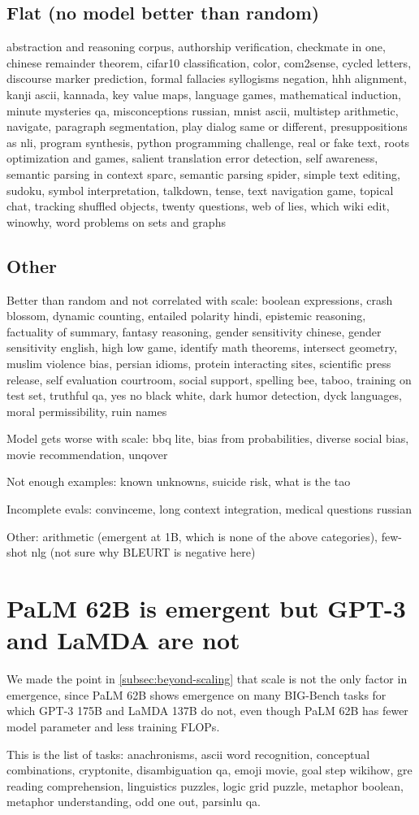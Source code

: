 \documentclass[10pt]{article} %
\begin{document}
\subsection{Flat (no model better than random)}\label{subsec:flat}
abstraction and reasoning corpus, authorship verification, checkmate in one, chinese remainder theorem, cifar10 classification, color, com2sense, cycled letters, discourse marker prediction, formal fallacies syllogisms negation, hhh alignment, kanji ascii, kannada, key value maps, language games, mathematical induction, minute mysteries qa, misconceptions russian, mnist ascii, multistep arithmetic, navigate, paragraph segmentation, play dialog same or different, presuppositions as nli, program synthesis, python programming challenge, real or fake text, roots optimization and games, salient translation error detection, self awareness, semantic parsing in context sparc, semantic parsing spider, simple text editing, sudoku, symbol interpretation, talkdown, tense, text navigation game, topical chat, tracking shuffled objects, twenty questions, web of lies, which wiki edit, winowhy, word problems on sets and graphs

\subsection{Other}
Better than random and not correlated with scale: boolean expressions, crash blossom, dynamic counting, entailed polarity hindi, epistemic reasoning, factuality of summary, fantasy reasoning, gender sensitivity chinese, gender sensitivity english, high low game, identify math theorems, intersect geometry, muslim violence bias, persian idioms, protein interacting sites, scientific press release, self evaluation courtroom, social support, spelling bee, taboo, training on test set, truthful qa, yes no black white, dark humor detection, dyck languages, moral permissibility, ruin names

Model gets worse with scale: bbq lite, bias from probabilities, diverse social bias, movie recommendation, unqover

Not enough examples: known unknowns, suicide risk, what is the tao

Incomplete evals: convinceme, long context integration, medical questions russian

Other: arithmetic (emergent at 1B, which is none of the above categories), few-shot nlg (not sure why BLEURT is negative here)

\section{PaLM 62B is emergent but GPT-3 and LaMDA are not}\label{sec:palm-62b-wins}
We made the point in \cref{subsec:beyond-scaling} that scale is not the only factor in emergence, since PaLM 62B shows emergence on many BIG-Bench tasks for which GPT-3 175B and LaMDA 137B do not, even though PaLM 62B has fewer model parameter and less training FLOPs.

This is the list of tasks: anachronisms, ascii word recognition, conceptual combinations, cryptonite, disambiguation qa, emoji movie, goal step wikihow, gre reading comprehension, linguistics puzzles, logic grid puzzle, metaphor boolean, metaphor understanding, odd one out, parsinlu qa.
\end{document}
